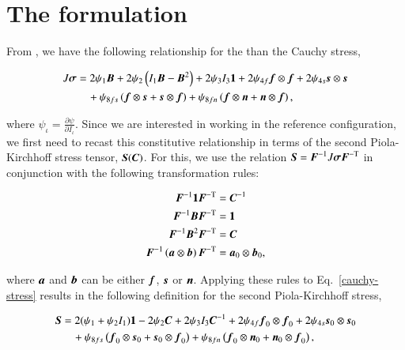 \section{The formulation}
\label{formulation}

From \citep{Holzapfel:2009bb}, we have the following relationship for
the than the Cauchy stress,

\begin{equation}
  \begin{split}
    J\mbox{\boldmath$\sigma$} &=   2 \psi_{1} \mbox{\boldmath$ B$}
                + 2 \psi_{2} \left(I_{1} \mbox{\boldmath$ B$} - \mbox{\boldmath$ B$}^{2}\right)
                + 2 \psi_{3} I_{3} {\bf 1}
                + 2 \psi_{4f} \mbox{\boldmath$ f$}\otimes\mbox{\boldmath$ f$}
                + 2 \psi_{4s} \mbox{\boldmath$ s$}\otimes\mbox{\boldmath$ s$}\\
        &\quad  + \psi_{8fs} \left( \mbox{\boldmath$ f$}\otimes\mbox{\boldmath$ s$} + \mbox{\boldmath$ s$}\otimes\mbox{\boldmath$ f$} \right)
                + \psi_{8fn} \left( \mbox{\boldmath$ f$}\otimes\mbox{\boldmath$ n$} + \mbox{\boldmath$ n$}\otimes\mbox{\boldmath$ f$} \right),
  \end{split}
  \label{cauchy-stress}
\end{equation}

\noindent where $\psi_{\iota} = \frac{\partial \psi}{\partial
  I_{\iota}}$. Since we are interested in working in the reference
configuration, we first need to recast this constitutive relationship
in terms of the second Piola-Kirchhoff stress tensor, $\mbox{\boldmath$ S$}(\mbox{\boldmath$ C$})$. For
this, we use the relation $\mbox{\boldmath$ S$} = \mbox{\boldmath$ F$}^{-1} J \mbox{\boldmath$\sigma$} \mbox{\boldmath$ F$}^{-\mathrm{T}}$
in conjunction with the following transformation rules:

\begin{equation*}
  \begin{split}
    \mbox{\boldmath$ F$}^{-1} {\bf 1} \mbox{\boldmath$ F$}^{-\mathrm{T}} &= \mbox{\boldmath$ C$}^{-1}\\
    \mbox{\boldmath$ F$}^{-1} \mbox{\boldmath$ B$} \mbox{\boldmath$ F$}^{-\mathrm{T}} &= {\bf 1}\\
    \mbox{\boldmath$ F$}^{-1} \mbox{\boldmath$ B$}^{2} \mbox{\boldmath$ F$}^{-\mathrm{T}} &= \mbox{\boldmath$ C$}\\
    \mbox{\boldmath$ F$}^{-1} \left(\mbox{\boldmath$ a$}\otimes\mbox{\boldmath$ b$}\right) \mbox{\boldmath$ F$}^{-\mathrm{T}} &= \mbox{\boldmath$ a$}_{0} \otimes \mbox{\boldmath$ b$}_{0},
  \end{split}
\end{equation*}

\noindent where $\mbox{\boldmath$ a$}$ and $\mbox{\boldmath$ b$}$ can be either $\mbox{\boldmath$ f$}$, $\mbox{\boldmath$ s$}$ or
$\mbox{\boldmath$ n$}$. Applying these rules to Eq.~\ref{cauchy-stress} results in the
following definition for the second Piola-Kirchhoff stress,

\begin{equation}
  \begin{split}
    \mbox{\boldmath$ S$} &=   2 (\psi_{1} + \psi_{2} I_{1}) {\bf 1}
           - 2 \psi_{2} \mbox{\boldmath$ C$}
                + 2 \psi_{3} I_{3} \mbox{\boldmath$ C$}^{-1}
                + 2 \psi_{4f} \mbox{\boldmath$ f$}_{0}\otimes\mbox{\boldmath$ f$}_{0}
                + 2 \psi_{4s} \mbox{\boldmath$ s$}_{0}\otimes\mbox{\boldmath$ s$}_{0}\\
        &\quad  + \psi_{8fs} \left( \mbox{\boldmath$ f$}_{0}\otimes\mbox{\boldmath$ s$}_{0} + \mbox{\boldmath$ s$}_{0}\otimes\mbox{\boldmath$ f$}_{0} \right)
                + \psi_{8fn} \left( \mbox{\boldmath$ f$}_{0}\otimes\mbox{\boldmath$ n$}_{0} + \mbox{\boldmath$ n$}_{0}\otimes\mbox{\boldmath$ f$}_{0} \right),
  \end{split}
  \label{second-piola-kirchhoff-stress}
\end{equation}

